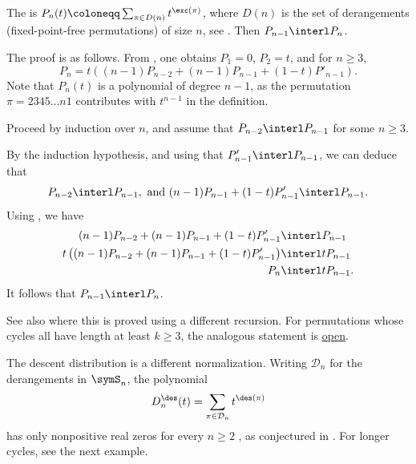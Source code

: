\begin{example*}
The \label{derangementPolynomial} is
$P_n(t)\coloneqq \sum_{\pi \in D(n)} t^{\exc(\pi)}$,
where $D(n)$ is the set of derangements (fixed-point-free permutations) of size $n$,
see . Then $P_{n-1} \interl P_n$.

The proof is as follows.
From \cite{MantaciRakotondrajao2003}, one obtains \(P_1=0\), \(P_2=t\),
and for \(n\geq 3\),
\[
 P_n = t \left( (n - 1) P_{n - 2} + (n-1)  P_{n - 1} + (1-t) P'_{n - 1} \right).
\]
Note that $P_n(t)$ is a polynomial of degree $n-1$, as the
permutation $\pi=2345\dotsc n 1$ contributes with $t^{n-1}$ in the definition.

Proceed by induction over \(n\), and assume that
\(P_{n-2}\interl P_{n-1}\) for some \(n\geq 3\).

By the induction hypothesis, and using that $P'_{n-1} \interl P_{n-1}$, we can deduce that
\[
  P_{n-2} \interl P_{n-1}, \text{ and }
 (n-1)P_{n-1} + (1-t)P'_{n-1} \interl P_{n-1}.
\]
Using \cite{Wagner1992}, we have
\begin{align*}
 (n-1)P_{n - 2} + (n-1)P_{n - 1} + (1-t)P'_{n-1} &\interl P_{n-1} \\
 t\left((n-1)P_{n - 2} + (n-1)P_{n - 1} + (1-t)P'_{n-1}\right) &\interl t P_{n-1} \\
 P_{n} &\interl t P_{n-1}.
\end{align*}
It follows that \(P_{n-1}\interl P_n\).

See also \cite{LiuWang2007} where this is proved using a different recursion.
For permutations whose cycles all have length at least $k\geq3$, the
analogous statement is \hyperref[conjLongCycleExcedances]{open}.
\end{example*}

The descent distribution is a different normalization.\label{derangementDescentPolynomial}
Writing
$\mathcal{D}_n$ for the derangements in $\symS_n$, the polynomial
\[
  D_n^{\des}(t)=\sum_{\pi\in\mathcal{D}_n}t^{\des(\pi)}
\]
has only nonpositive real zeros for every $n\geq2$
\cite[Thm.~2.1]{Alexandersson2026Eulerian}, as conjectured in
\cite{FuLinZeng2018}.  For longer cycles, see the next example.

